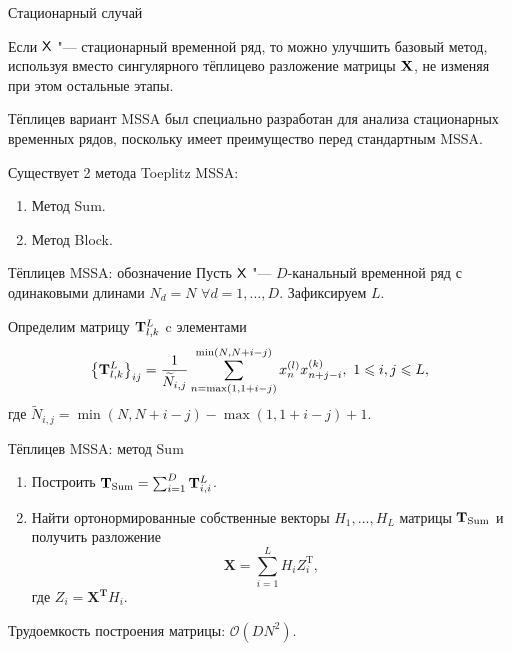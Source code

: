 \documentclass[ucs, notheorems, handout]{beamer}
\begin{document}
\begin{frame}{Стационарный случай}

	
	Если $\mathsf{X}$ "--- стационарный временной ряд, то можно улучшить базовый метод, используя вместо сингулярного тёплицево разложение матрицы $\mathbf{X}$, не изменяя при этом остальные этапы.\medskip
	
	Тёплицев вариант MSSA был специально разработан для анализа стационарных временных рядов, поскольку имеет преимущество перед стандартным MSSA. \medskip
	
	Существует 2 метода Toeplitz MSSA:\medskip
	\begin{enumerate}
		\item Метод Sum.\medskip
		\item Метод Block.\medskip
	\end{enumerate}
	
\end{frame}
\begin{frame}{Тёплицев MSSA: обозначение}
	Пусть $\mathsf{X}$ "--- $D$-канальный временной ряд с одинаковыми длинами $N_d=N$ $\forall d=1,\ldots,D$. Зафиксируем $L$.\medskip
	
	Определим матрицу $\mathbf{T}_{l,k}^{L}$ c элементами
	\begin{equation*}\label{eq:block_elements}
	\left\{\mathbf{T}^L_{l,k}\right\}_{ij}=\frac{1}{\widetilde N_{i,j}}\sum_{n=\max(1,1+i-j)}^{\min(N,N+i-j)} x^{(l)}_nx^{(k)}_{n+j-i},\ 1\leqslant i,j\leqslant L,
	\end{equation*}
	где $\widetilde N_{i,j}=\min(N,N+i-j)-\max(1,1+i-j)+1$.
\end{frame}
\begin{frame}{Тёплицев MSSA: метод Sum}
	\begin{enumerate}
		\item Построить $\mathbf{T}_{\text{Sum}}=\sum_{i=1}^D \mathbf{T}^{L}_{i,i}$.\medskip
		\item Найти ортонормированные собственные векторы $H_1,\ldots,H_L$ матрицы $\mathbf{T}_{\text{Sum}}$ и получить разложение
		\begin{equation*}
			\mathbf{X}=\sum_{i=1}^L H_i Z_i^\mathrm{T},
		\end{equation*}
		где $Z_i=\mathbf{X^T}H_i$.\medskip
	\end{enumerate}
	Трудоемкость построения матрицы: $\mathcal{O}(DN^2)$.
\end{frame}
\end{document}
